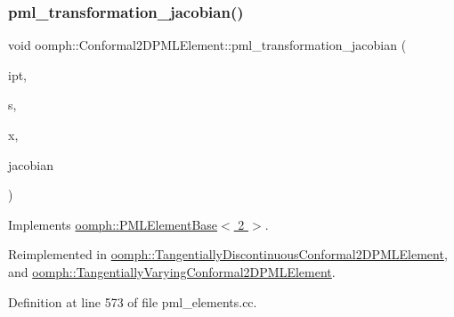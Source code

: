 \subsubsection{\texorpdfstring{pml\+\_\+transformation\+\_\+jacobian()}{pml\_transformation\_jacobian()}\hspace{0.1cm}{\footnotesize\ttfamily [1/2]}}
{\footnotesize\ttfamily void oomph\+::\+Conformal2\+D\+P\+M\+L\+Element\+::pml\+\_\+transformation\+\_\+jacobian (\begin{DoxyParamCaption}\item[{const unsigned \&}]{ipt,  }\item[{const \hyperlink{classoomph_1_1Vector}{Vector}$<$ double $>$ \&}]{s,  }\item[{const \hyperlink{classoomph_1_1Vector}{Vector}$<$ double $>$ \&}]{x,  }\item[{\hyperlink{classoomph_1_1DenseComplexMatrix}{Dense\+Complex\+Matrix} \&}]{jacobian }\end{DoxyParamCaption})\hspace{0.3cm}{\ttfamily [virtual]}}



Implements \hyperlink{classoomph_1_1PMLElementBase_a770d8de20d8ae2d55f5f006052a39b3f}{oomph\+::\+P\+M\+L\+Element\+Base$<$ 2 $>$}.



Reimplemented in \hyperlink{classoomph_1_1TangentiallyDiscontinuousConformal2DPMLElement_a906b78ba975b45dd3702ee8b42dc68cd}{oomph\+::\+Tangentially\+Discontinuous\+Conformal2\+D\+P\+M\+L\+Element}, and \hyperlink{classoomph_1_1TangentiallyVaryingConformal2DPMLElement_adcd024767abae57059b87fa19b1d489c}{oomph\+::\+Tangentially\+Varying\+Conformal2\+D\+P\+M\+L\+Element}.



Definition at line 573 of file pml\+\_\+elements.\+cc.

\mbox{\label{classoomph_1_1Conformal2DPMLElement_a1d352e991b9ad7622c27b82d474b4877}} 
